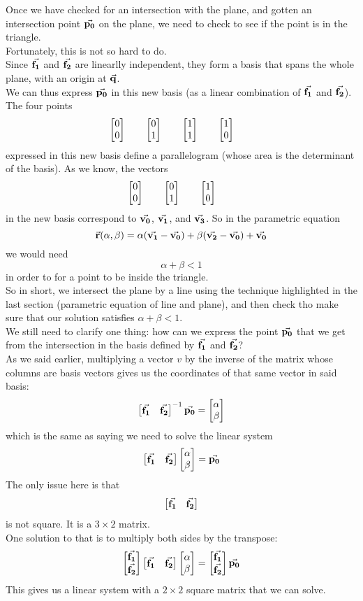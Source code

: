 \documentclass[12pt]{article}
\begin{document}
Once we have checked for an intersection with the
plane,
and gotten an intersection point $\vec{\mathbf{p_0}}$
on the plane,
we need to check to see if the point is in the
triangle. \\
Fortunately, this is not so hard to do. \\
Since $\vec{\mathbf{f_1}}$ and $\vec{\mathbf{f_2}}$
are linearlly independent,
they form a basis that spans the whole plane,
with an origin at $\vec{\mathbf{q}}$. \\
We can thus express $\vec{\mathbf{p_0}}$ in this
new basis (as a linear combination
of $\vec{\mathbf{f_1}}$ and $\vec{\mathbf{f_2}}$). \\
The four points
\[ \begin{bmatrix} {0}\\{0} \end{bmatrix} \qquad
\begin{bmatrix} {0}\\{1} \end{bmatrix} \qquad
\begin{bmatrix} {1}\\{1} \end{bmatrix} \qquad
\begin{bmatrix} {1}\\{0} \end{bmatrix} \qquad \]
expressed in this new basis
define a parallelogram
(whose area is the determinant of the basis).
As we know, the vectors
\[ \begin{bmatrix} {0}\\{0} \end{bmatrix} \qquad
\begin{bmatrix} {0}\\{1} \end{bmatrix} \qquad
\begin{bmatrix} {1}\\{0} \end{bmatrix} \qquad \]
in the new basis correspond to
$\vec{\mathbf{v_0}}$, $\vec{\mathbf{v_1}}$, and $\vec{\mathbf{v_3}}$.
So in the parametric equation
\[ \vec{\mathbf{r}}(\alpha, \beta) 
= \alpha (\vec{\mathbf{v_1}} - \vec{\mathbf{v_0}})
+ \beta (\vec{\mathbf{v_2}} - \vec{\mathbf{v_0}}) + \vec{\mathbf{v_0}} \]
we would need
\[ \alpha + \beta < 1 \]
in order to for a point to be inside the triangle. \\

So in short, we intersect the plane by a line
using the technique highlighted in the last section
(parametric equation of line and plane),
and then check tho make sure that our solution
satisfies $\alpha + \beta < 1$. \\

We still need to clarify one thing:
how can we express the point $\vec{\mathbf{p_0}}$
that we get from the intersection
in the basis defined by $\vec{\mathbf{f_1}}$ and $\vec{\mathbf{f_2}}$? \\
As we said earlier,
multiplying a vector $v$ by the inverse 
of the matrix
whose columns are basis vectors
gives us the coordinates
of that same vector in said basis:
\[ \begin{bmatrix} {\vec{\mathbf{f_1}}}&{\vec{\mathbf{f_2}}} \end{bmatrix}^{-1}
\vec{\mathbf{p_0}} = \begin{bmatrix} {\alpha}\\{\beta} \end{bmatrix} \]
which is the same as saying we need to 
solve the linear system
\[ \begin{bmatrix} {\vec{\mathbf{f_1}}}&{\vec{\mathbf{f_2}}} \end{bmatrix}
\begin{bmatrix} {\alpha} \\ {\beta} \end{bmatrix}
= \vec{\mathbf{p_0}} \]
The only issue here is that
\[\begin{bmatrix} {\vec{\mathbf{f_1}}} & {\vec{\mathbf{f_2}}} \end{bmatrix}\]
is not square.
It is a $3 \times 2$ matrix. \\
One solution to that is to multiply both sides
by the transpose:
\[ \begin{bmatrix} {\vec{\mathbf{f_1}}}\\{\vec{\mathbf{f_2}}} \end{bmatrix}
\begin{bmatrix} {\vec{\mathbf{f_1}}} & {\vec{\mathbf{f_2}}} \end{bmatrix}
\begin{bmatrix} {\alpha} \\ {\beta} \end{bmatrix}
= \begin{bmatrix} {\vec{\mathbf{f_1}}} \\ {\vec{\mathbf{f_2}}} \end{bmatrix} \vec{\mathbf{p_0}} \]
This gives us a linear system with a $2 \times 2$
square matrix that we can solve. \\
\end{document}
